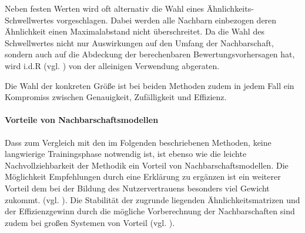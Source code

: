 Neben festen Werten wird oft alternativ die Wahl eines Ähnlichkeits-Schwellwertes vorgeschlagen. Dabei werden alle Nachbarn einbezogen deren Ähnlichkeit einen Maximalabstand nicht überschreitet. Da die Wahl des Schwellwertes nicht nur Auswirkungen auf den Umfang der Nachbarschaft, sondern auch auf die Abdeckung der berechenbaren Bewertungsvorhersagen hat, wird i.d.R (vgl. \citep{Herlocker:2002:EAD:593967.594047, Herlocker:1999:AFP:312624.312682}) von der alleinigen Verwendung abgeraten.

Die Wahl der konkreten Größe ist bei beiden Methoden zudem in jedem Fall ein Kompromiss zwischen Genauigkeit, Zufälligkeit und Effizienz. 

\paragraph{Vorteile von Nachbarschaftsmodellen} Dass zum Vergleich mit den im Folgenden beschriebenen Methoden, keine langwierige Trainingsphase notwendig ist, ist  ebenso wie die leichte Nachvollziehbarkeit der  Methodik ein Vorteil von Nachbarschaftsmodellen. Die Möglichkeit Empfehlungen durch eine Erklärung zu ergänzen ist ein weiterer Vorteil dem bei der Bildung des Nutzervertrauens besonders viel Gewicht zukommt.  (vgl. \citep{hb_15}). Die Stabilität der zugrunde liegenden Ähnlichkeitsmatrizen und der Effizienzgewinn durch die mögliche Vorberechnung der Nachbarschaften sind zudem bei großen Systemen von Vorteil (vgl. \citep{linden03}).\citep{hb_04} 
